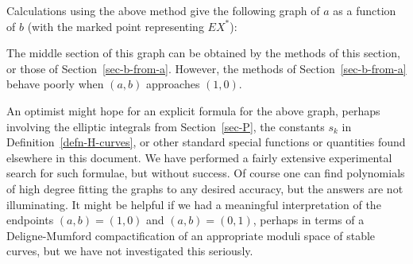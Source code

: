 \documentclass[reqno]{amsart}
\renewcommand{\:}{\colon}
\theoremstyle{definition}
\begin{document}
Calculations using the above method give the following graph of $a$ as
a function of $b$ (with the marked point representing $EX^*$):
\begin{center}
\end{center}
The middle section of this graph can be obtained by the methods of
this section, or those of Section~\ref{sec-b-from-a}.  However, the
methods of Section~\ref{sec-b-from-a} behave poorly when $(a,b)$
approaches $(1,0)$.

An optimist might hope for an explicit formula for the above graph,
perhaps involving the elliptic integrals from
Section~\ref{sec-P}, the constants $s_k$ in
Definition~\ref{defn-H-curves}, or other standard special
functions or quantities found elsewhere in this document.  We have
performed a fairly extensive experimental search for such formulae,
but without success.  Of course one can find polynomials of high
degree fitting the graphs to any desired accuracy, but the answers are
not illuminating.  It might be helpful if we had a meaningful
interpretation of the endpoints $(a,b)=(1,0)$ and $(a,b)=(0,1)$,
perhaps in terms of a Deligne-Mumford compactification of an
appropriate moduli space of stable curves, but we have not
investigated this seriously.
\end{document}
